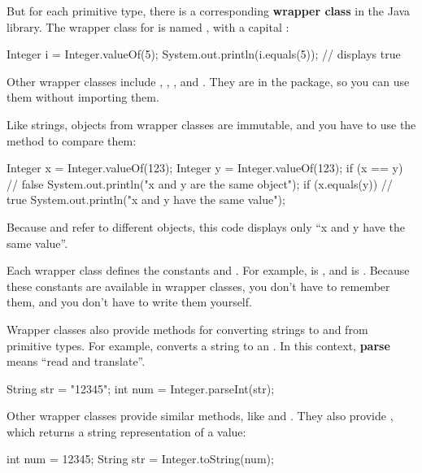 But for each primitive type, there is a corresponding {\bf wrapper class} in the Java library.
The wrapper class for  is named , with a capital :

\begin{code}
Integer i = Integer.valueOf(5);
System.out.println(i.equals(5));  // displays true
\end{code}

Other wrapper classes include , , , and .
They are in the  package, so you can use them without importing them.

Like strings, objects from wrapper classes are immutable, and you have to use the  method to compare them:

\begin{code}
Integer x = Integer.valueOf(123);
Integer y = Integer.valueOf(123);
if (x == y) {                     // false
    System.out.println("x and y are the same object");
}
if (x.equals(y)) {                // true
    System.out.println("x and y have the same value");
}
\end{code}

Because  and  refer to different objects, this code displays only ``x and y have the same value''.

Each wrapper class defines the constants  and .
For example,  is , and  is .
Because these constants are available in wrapper classes, you don't have to remember them, and you don't have to write them yourself.


Wrapper classes also provide methods for converting strings to and from primitive types.
For example,  converts a string to an .
In this context, {\bf parse} means ``read and translate''.

\begin{code}
String str = "12345";
int num = Integer.parseInt(str);
\end{code}

Other wrapper classes provide similar methods, like  and .
They also provide , which returns a string representation of a value:

\begin{code}
int num = 12345;
String str = Integer.toString(num);
\end{code}

